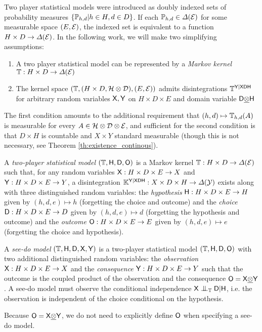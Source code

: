 Two player statistical models were introduced as doubly indexed sets of probability measures $\{\mathbb{P}_{h,d}|h\in H,d\in D\}$. If each $\mathbb{P}_{h,d}\in \Delta(\mathcal{E})$ for some measurable space $(E,\mathcal{E})$, the indexed set is equivalent to a function $H\times D\to \Delta(\mathcal{E})$. In the following work, we will make two simplifying assumptions:

\begin{enumerate}
    \item A two player statistical model can be represented by a \emph{Markov kernel} $\mathbb{T}:H\times D\to \Delta(\mathcal{E})$
    \item The kernel space $(\mathbb{T},(H\times D,\mathcal{H}\otimes\mathcal{D}),(E,\mathcal{E}))$ admits disintegrations $\mathbb{T}^{\mathsf{Y}|\mathsf{XDH}}$ for arbitrary random variables $\mathsf{X},\mathsf{Y}$ on $H\times D\times E$ and domain variable $\mathsf{D}\underline{\otimes}\mathsf{H}$
\end{enumerate}

The first condition amounts to the additional requirement that $(h,d)\mapsto \mathbb{T}_{h,d}(A)$ is measurable for every $A\in \mathcal{H}\otimes\mathcal{D}\otimes\mathcal{E}$, and sufficient for the second condition is that $D\times H$ is countable and $X\times Y$ standard measurable (though this is not necessary, see Theorem \ref{th:existence_continous}).

\begin{definition}\label{def:2p_stat}
A \emph{two-player statistical model} $(\mathbb{T},\mathsf{H},\mathsf{D},\mathsf{O})$ is a Markov kernel $\mathbb{T}:H\times D\to \Delta(\mathcal{E})$ such that, for any random variables $\mathsf{X}: H\times D\times E\to X$ and $\mathsf{Y}:H\times D\times E\to Y$, a disintegration $\mathbb{K}^{\mathsf{Y}|\mathsf{XDH}}:X\times D\times H\to \Delta(\mathcal{Y})$ exists along with three distinguished random variables: the \emph{hypothesis} $\mathsf{H}:H\times D\times E\to H$ given by $(h,d,e)\mapsto h$ (forgetting the choice and outcome) and the \emph{choice} $\mathsf{D}:H\times D\times E\to D$ given by $(h,d,e)\mapsto d$ (forgetting the hypothesis and outcome) and the \emph{outcome} $\mathsf{O}:H\times D\times E\to E$ given by $(h,d,e)\mapsto e$ (forgetting the choice and hypothesis).
\end{definition}

\begin{definition}\label{def:seedo}
A \emph{see-do model} $(\mathbb{T},\mathsf{H},\mathsf{D},\mathsf{X},\mathsf{Y})$ is a two-player statistical model $(\mathbb{T},\mathsf{H},\mathsf{D},\mathsf{O})$ with two additional distinguished random variables: the \emph{observation} $\mathsf{X}: H\times D\times E\to X$ and the \emph{consequence} $\mathsf{Y}:H\times D\times E\to Y$ such that the outcome is the coupled product of the observation and the consequence $\mathsf{O}=\mathsf{X}\underline{\otimes}\mathsf{Y}$. A see-do model must observe the conditional independence $\RV{X}\CI_\kernel{T} \RV{D}|\RV{H}$, i.e. the observation is independent of the choice conditional on the hypothesis.

Because $\mathsf{O}=\mathsf{X}\underline{\otimes} \mathsf{Y}$, we do not need to explicitly define $\mathsf{O}$ when specifying a see-do model.
\end{definition}

